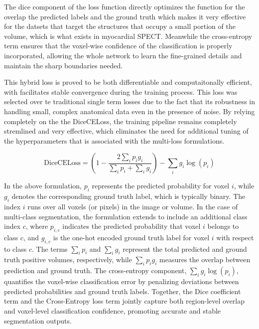 The dice component of the loss function directly optimizes the function for the overlap the predicted labels and the ground truth which makes it very effective for the datsets that target the structures that occupy a small portion of the volume, which is what exists in myocardial SPECT. Meanwhile the cross-entropy term ensures that the voxel-wise confidence of the classification is properly incorporated, allowing the whole network to learn the fine-grained details and maintain the sharp boundaries needed.

This hybrid loss is proved to be both differentiable and computaitonally efficient, with facilitates stable convergence during the training process. This loss was selected over te traditional single term losses due to the fact that its robustness in handling small, complex anatomical data even in the presence of noise. By relying completely on the the DiceCELoss, the training pipeline remains completely stremlined and very effective, which eliminates the need for additional tuning of the hyperparameters that is associated with the multi-loss formulations.

\begin{equation}
    \text{DiceCELoss} = \left( 1 - \frac{2 \sum_{i} p_i g_i}{\sum_{i} p_i + \sum_{i} g_i} \right) - \sum_{i} g_i \log(p_i)
\end{equation}

In the above formulation, \( p_i \) represents the predicted probability for voxel \( i \), while \( g_i \) denotes the corresponding ground truth label, which is typically binary. The index \( i \) runs over all voxels (or pixels) in the image or volume. In the case of multi-class segmentation, the formulation extends to include an additional class index \( c \), where \( p_{i,c} \) indicates the predicted probability that voxel \( i \) belongs to class \( c \), and \( g_{i,c} \) is the one-hot encoded ground truth label for voxel \( i \) with respect to class \( c \). The terms \( \sum_i p_i \) and \( \sum_i g_i \) represent the total predicted and ground truth positive volumes, respectively, while \( \sum_i p_i g_i \) measures the overlap between prediction and ground truth. The cross-entropy component, \( \sum_i g_i \log(p_i) \), quantifies the voxel-wise classification error by penalizing deviations between predicted probabilities and ground truth labels. Together, the Dice coefficient term and the Cross-Entropy loss term jointly capture both region-level overlap and voxel-level classification confidence, promoting accurate and stable segmentation outputs.

